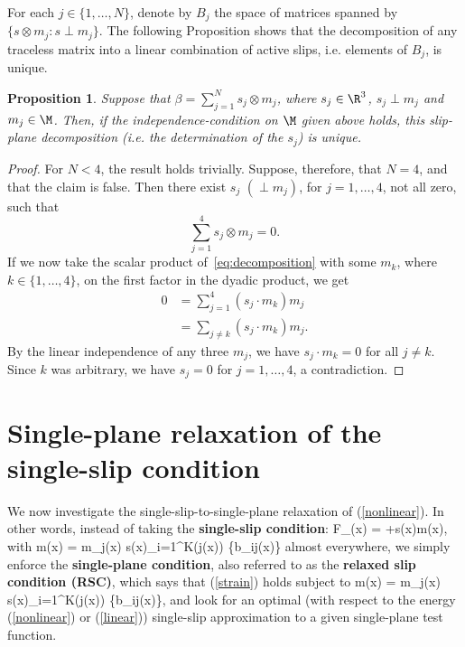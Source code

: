 \documentclass[11pt,reqno]{amsart}
\theoremstyle{plain}
\newtheorem{proposition}[theorem]{Proposition}
\theoremstyle{definition}
\theoremstyle{remark}
\begin{document}
For each $j\in \{1,\dots, N\}$, denote by $B_j$ the space of matrices spanned by $\{s\otimes m_j : s \perp m_j \}$. The following Proposition shows that the decomposition of any traceless matrix into a linear combination of active slips, i.e. elements of $B_j$, is unique.
\begin{proposition} \label{prop:unique_decomp}
Suppose that $\beta=\sum_{j=1}^N s_j \otimes m_j$, where $s_j\in \R^3$, $s_j \perp m_j$ and $m_j\in\M$. Then, if the independence-condition on $\M$ given above holds, this slip-plane decomposition (i.e. the determination of the $s_j$) is unique.
\end{proposition}
\begin{proof}
For $N<4$, the result holds trivially. Suppose, therefore, that $N=4$, and that the claim is false. Then there exist $s_j$ $(\perp m_j)$, for  $j= 1, \dots, 4$, not all zero, such that 
\begin{equation} \label{eq:decomposition}
\sum_{j=1}^4 s_j \otimes m_j = 0.
\end{equation}
If we now take the scalar product of~\eqref{eq:decomposition} with some $m_k$, where $k\in\{1,\dots, 4\}$, on the first factor in the dyadic product, we get
\begin{align*}
0 &= \sum_{j=1}^4 (s_j\cdot m_k) m_j \\
&= \sum_{j\neq k} (s_j\cdot m_k) m_j.
\end{align*}
By the linear independence of any three $m_j$, we have $s_j \cdot m_k =0$ for all $j\neq k$. Since $k$ was arbitrary, we have $s_j= 0$ for $j = 1, \dots, 4$, a contradiction.
\end{proof}

\section{Single-plane relaxation of the single-slip condition} \label{sec:relax}

We now investigate the single-slip-to-single-plane relaxation of (\ref{nonlinear}). In other words, instead of taking the \textbf{single-slip condition}:
\be\label{strain}
F_\pl(x) = \Id+s(x)\otimes m(x),
\ee
with
\be\label{ssc}
m(x) = m_{j(x)}\in{}  s(x)\in\bigcup_{i=1}^{K(j(x))} \{b_{ij(x)}\}
\ee
almost everywhere, we simply enforce the \textbf{single-plane condition}, also referred to as the \textbf{relaxed slip condition (RSC)}, which says that (\ref{strain}) holds subject to
\be\label{rsc}
m(x) = m_{j(x)}\in{}  s(x)\in{}\bigcup_{i=1}^{K(j(x))} \{b_{ij(x)}\},
\ee
and look for an optimal (with respect to the energy (\ref{nonlinear}) or (\ref{linear})) single-slip approximation to a given single-plane test function. 
\end{document}

